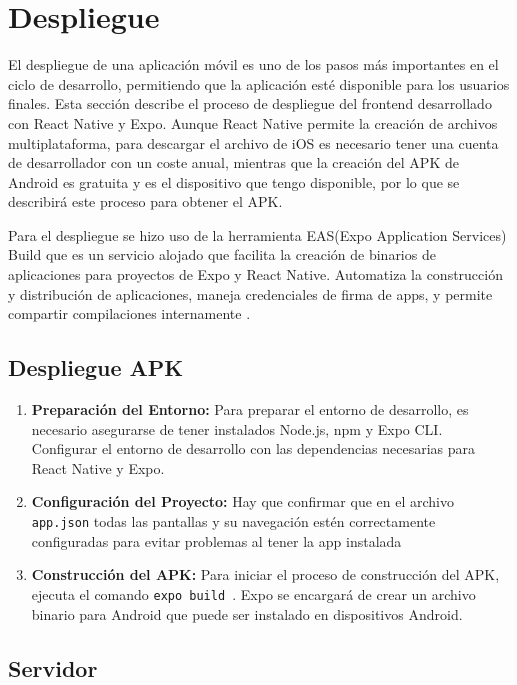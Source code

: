 \chapter{Despliegue}

El despliegue de una aplicación móvil es uno de los pasos más importantes en el ciclo de desarrollo, permitiendo que la aplicación esté disponible para los usuarios finales. Esta sección describe el proceso de despliegue del frontend desarrollado con React Native y Expo. Aunque React Native permite la creación de archivos multiplataforma, para descargar el archivo de iOS es necesario tener una cuenta de desarrollador con un coste anual, mientras que la creación del APK de Android es gratuita y es el dispositivo que tengo disponible, por lo que se describirá este proceso para obtener el APK.

Para el despliegue se hizo uso de la herramienta EAS(Expo Application Services) Build que es un servicio alojado que facilita la creación de binarios de aplicaciones para proyectos de Expo y React Native. Automatiza la construcción y distribución de aplicaciones, maneja credenciales de firma de apps, y permite compartir compilaciones internamente \cite{easbuild}.

\section{Despliegue APK}

\begin{enumerate}
    \item \textbf{Preparación del Entorno: } Para preparar el entorno de desarrollo, es necesario asegurarse de tener instalados Node.js, npm y Expo CLI. Configurar el entorno de desarrollo con las dependencias necesarias para React Native y Expo.
    \item \textbf{Configuración del Proyecto: } Hay que confirmar que en el archivo \texttt{app.json} todas las pantallas y su navegación estén correctamente configuradas para evitar problemas al tener la app instalada
    \item \textbf{Construcción del APK: } Para iniciar el proceso de construcción del APK, ejecuta el comando \texttt{expo build
          }. Expo se encargará de crear un archivo binario para Android que puede ser instalado en dispositivos Android.

\end{enumerate}

\section{Servidor}

